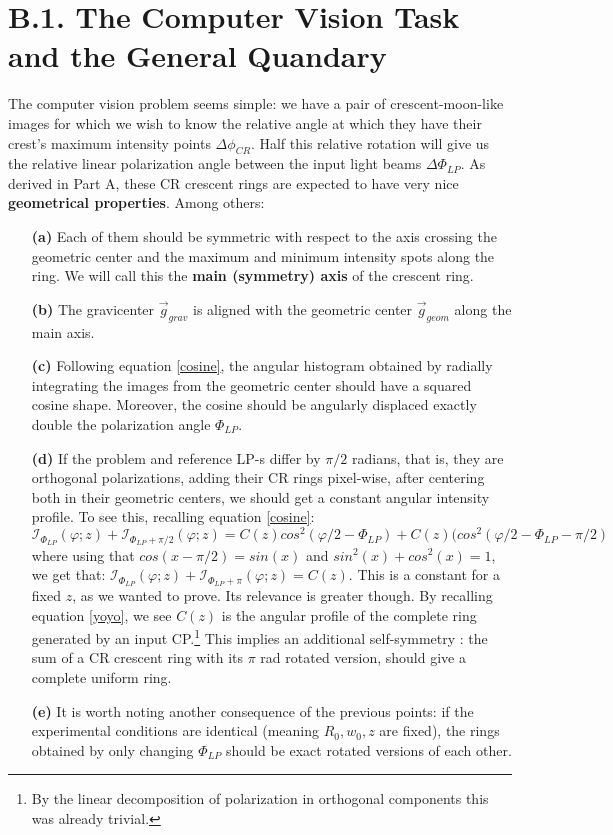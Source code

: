 \documentclass[11pt, a4paper, twoside]{article} %
\begin{document}
\section*{B.1. The Computer Vision Task and the General Quandary}
The computer vision problem seems simple: we have a pair of crescent-moon-like images for which we wish to know the relative angle at which they have their crest's maximum intensity points $\Delta \phi_{CR}$. Half this relative rotation will give us the relative linear polarization angle between the input light beams $\Delta \Phi_{LP}$. As derived in Part A, these CR crescent rings are expected to have very nice {\bf geometrical properties}. Among others:
\begin{itemize}
\item[\bf (a)] Each of them should be symmetric with respect to the axis crossing the geometric center and the maximum and minimum intensity spots along the ring. We will call this the {\bf main (symmetry) axis} of the crescent ring.
\item[\bf (b)] The gravicenter $\vec{g}_{grav}$ is aligned with the geometric center $\vec{g}_{geom}$ along the main axis.
\item[\bf (c)] Following equation \eqref{cosine}, the angular histogram obtained by radially integrating the images from the geometric center should have a squared cosine shape. Moreover, the cosine should be angularly displaced exactly double the polarization angle $\Phi_{LP}$.
\item[\bf (d)] If the problem and reference LP-s differ by $\pi/2$ radians, that is, they are orthogonal polarizations, adding their CR rings pixel-wise, after centering both in their geometric centers, we should get a constant angular intensity profile. To see this, recalling equation \eqref{cosine}:
\begin{equation}
\mathcal{I}_{\Phi_{LP}}(\varphi;z)+\mathcal{I}_{\Phi_{LP}+\pi/2}(\varphi;z) = C(z)cos^2(\varphi/2-\Phi_{LP})+C(z)(cos^2(\varphi/2-\Phi_{LP}-\pi/2)
\end{equation}
where using that $cos(x-\pi/2)=sin(x)$ and $sin^2(x)+cos^2(x)=1$, we get that: $\mathcal{I}_{\Phi_{LP}}(\varphi;z)+\mathcal{I}_{\Phi_{LP}+\pi}(\varphi;z) = C(z)$. This is a constant for a fixed $z$, as we wanted to prove. Its relevance is greater though. By recalling equation \eqref{yoyo}, we see $C(z)$ is the angular profile of the complete ring generated by an input CP.\footnote{By the linear decomposition of polarization in orthogonal components this was already trivial.} This implies an additional self-symmetry : the sum of a CR crescent ring with its $\pi$ rad rotated version, should give a complete uniform ring.
\item[\bf (e)] It is worth noting another consequence of the previous points: if the experimental conditions are identical (meaning $R_0,w_0,z$ are fixed), the rings obtained by only changing $\Phi_{LP}$ should be exact rotated versions of each other.
\end{itemize}
\end{document}

